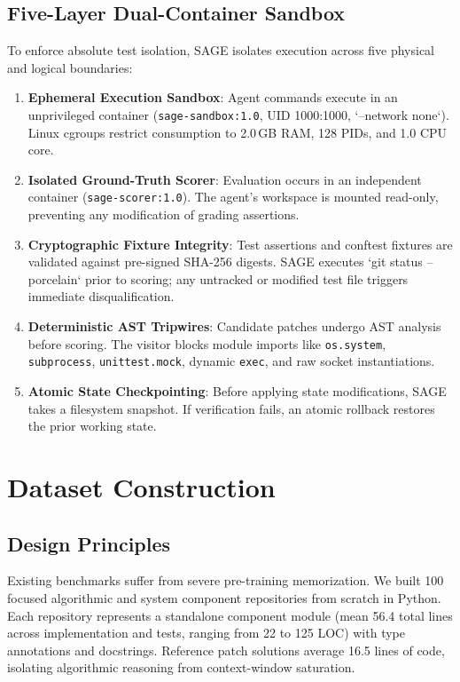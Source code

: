 \documentclass[conference]{IEEEtran}
\begin{document}
\subsection{Five-Layer Dual-Container Sandbox}
\label{sec:sandbox}
To enforce absolute test isolation, SAGE isolates execution across five physical and logical boundaries:
\begin{enumerate}
    \item \textbf{Ephemeral Execution Sandbox}: Agent commands execute in an unprivileged container (\texttt{sage-sandbox:1.0}, UID 1000:1000, `--network none`). Linux cgroups restrict consumption to 2.0\,GB RAM, 128 PIDs, and 1.0 CPU core.
    \item \textbf{Isolated Ground-Truth Scorer}: Evaluation occurs in an independent container (\texttt{sage-scorer:1.0}). The agent's workspace is mounted read-only, preventing any modification of grading assertions.
    \item \textbf{Cryptographic Fixture Integrity}: Test assertions and conftest fixtures are validated against pre-signed SHA-256 digests. SAGE executes `git status --porcelain` prior to scoring; any untracked or modified test file triggers immediate disqualification.
    \item \textbf{Deterministic AST Tripwires}: Candidate patches undergo AST analysis before scoring. The visitor blocks module imports like \texttt{os.system}, \texttt{subprocess}, \texttt{unittest.mock}, dynamic \texttt{exec}, and raw socket instantiations.
    \item \textbf{Atomic State Checkpointing}: Before applying state modifications, SAGE takes a filesystem snapshot. If verification fails, an atomic rollback restores the prior working state.
\end{enumerate}

\section{Dataset Construction}
\label{sec:dataset}

\subsection{Design Principles}
Existing benchmarks suffer from severe pre-training memorization. We built 100 focused algorithmic and system component repositories from scratch in Python. Each repository represents a standalone component module (mean 56.4 total lines across implementation and tests, ranging from 22 to 125 LOC) with type annotations and docstrings. Reference patch solutions average 16.5 lines of code, isolating algorithmic reasoning from context-window saturation.
\end{document}
